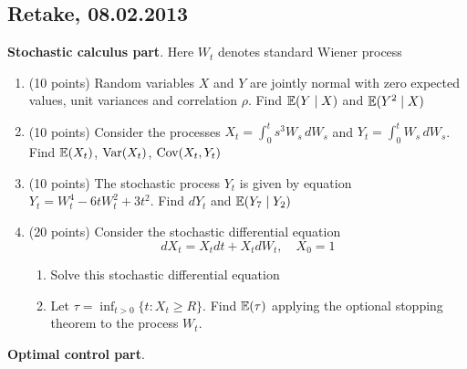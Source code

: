 \documentclass[pdftex,12pt,a4paper]{article}
\begin{document}
\subsection{Retake, 08.02.2013}

\textbf{Stochastic calculus part}. Here $W_t$ denotes standard Wiener process 

\vspace{20pt}

\begin{enumerate}
\item (10 points) Random variables $X$ and $Y$ are jointly normal with zero expected values, unit variances and correlation $\rho$. Find $\mathbb{E}(Y \mid X)$ and $\mathbb{E}(Y^2 \mid X)$
\item (10 points) Consider the processes $X_t=\int_0^t s^3 W_s\,dW_s$ and $Y_t=\int_0^t W_s \, dW_s$. Find $\mathbb{E}(X_t)$, $\operatorname{Var}(X_t)$, $\operatorname{Cov}(X_t,Y_t)$
\item (10 points) The stochastic process $Y_t$ is given by equation $Y_t=W_t^4-6tW_t^2+3t^2$. Find $dY_t$ and $\mathbb{E}(Y_7 \mid Y_2)$
\item (20 points) Consider the stochastic differential equation
\[
dX_t=X_t dt + X_t dW_t, \quad X_0=1
\]
\begin{enumerate}
\item Solve this stochastic differential equation
\item Let $\tau=\inf_{t>0} \{t:X_t\ge R\}$. Find $\mathbb{E}(\tau)$ applying the optional stopping theorem to the process $W_t$.
\end{enumerate}

\end{enumerate}

\vspace{20pt}

\textbf{Optimal control part}.  

\vspace{20pt}
\end{document}
